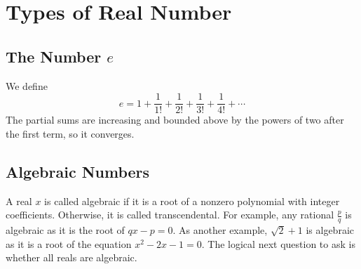 \documentclass{article}
\begin{document}
\section{Types of Real Number}
\subsection{The Number $e$}
We define
\[ e = 1 + \frac{1}{1!} + \frac{1}{2!} + \frac{1}{3!} + \frac{1}{4!} + \cdots \]
The partial sums are increasing and bounded above by the powers of two after the first term, so it converges.

\subsection{Algebraic Numbers}
A real $x$ is called algebraic if it is a root of a nonzero polynomial with integer coefficients. Otherwise, it is called transcendental. For example, any rational $\frac{p}{q}$ is algebraic as it is the root of $qx-p=0$. As another example, $\sqrt 2 + 1$ is algebraic as it is a root of the equation $x^2 - 2x - 1 = 0$. The logical next question to ask is whether all reals are algebraic.
\end{document}
